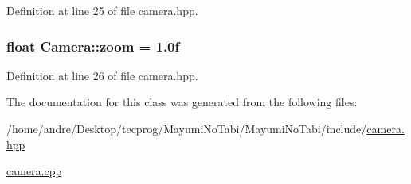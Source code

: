 Definition at line 25 of file camera.\-hpp.

\hypertarget{class_camera_a21fc9e142b104d8e94126657abaa075f}{
\subsubsection[{zoom}]{\setlength{\rightskip}{0pt plus 5cm}float Camera\-::zoom = 1.\-0f\hspace{0.3cm}{\ttfamily [static]}}}\label{class_camera_a21fc9e142b104d8e94126657abaa075f}


Definition at line 26 of file camera.\-hpp.



The documentation for this class was generated from the following files\-:\begin{DoxyCompactItemize}
\item 
/home/andre/\-Desktop/tecprog/\-Mayumi\-No\-Tabi/\-Mayumi\-No\-Tabi/include/\hyperlink{camera_8hpp}{camera.\-hpp}\item 
\hyperlink{camera_8cpp}{camera.\-cpp}\end{DoxyCompactItemize}
